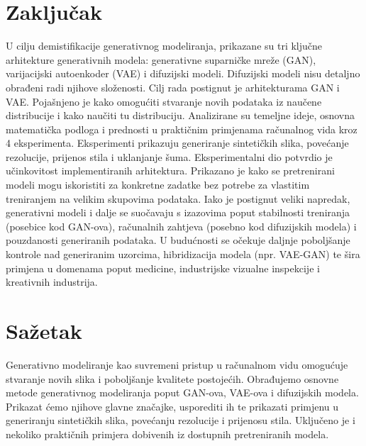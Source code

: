 \documentclass[times, utf8, seminar, numeric]{fer}
\begin{document}
		
	\chapter{Zaključak}
	U cilju demistifikacije generativnog modeliranja, prikazane su tri ključne arhitekture generativnih modela: generativne suparničke mreže (GAN), varijacijski autoenkoder (VAE) i difuzijski modeli. Difuzijski modeli nisu detaljno obrađeni radi njihove složenosti. Cilj rada postignut je arhitekturama GAN i VAE. Pojašnjeno je kako omogućiti stvaranje novih podataka iz naučene distribucije i kako naučiti tu distribuciju. Analizirane su temeljne ideje, osnovna matematička podloga i prednosti u praktičnim primjenama računalnog vida kroz 4 eksperimenta. Eksperimenti prikazuju generiranje sintetičkih slika, povećanje rezolucije, prijenos stila i uklanjanje šuma. Eksperimentalni dio potvrdio je učinkovitost implementiranih arhitektura. Prikazano je kako se pretrenirani modeli mogu iskoristiti za konkretne zadatke bez potrebe za vlastitim treniranjem na velikim skupovima podataka. Iako je postignut veliki napredak, generativni modeli i dalje se suočavaju s izazovima poput stabilnosti treniranja (posebice kod GAN-ova), računalnih zahtjeva (posebno kod difuzijskih modela) i pouzdanosti generiranih podataka. U budućnosti se očekuje daljnje poboljšanje kontrole nad generiranim uzorcima, hibridizacija modela (npr. VAE-GAN) te šira primjena u domenama poput medicine, industrijske vizualne inspekcije i kreativnih industrija.
	
	\chapter{Sažetak}
		Generativno modeliranje kao suvremeni pristup u računalnom vidu omogućuje stvaranje novih slika i poboljšanje kvalitete postojećih. Obrađujemo osnovne metode generativnog modeliranja poput GAN-ova, VAE-ova i difuzijskih modela. Prikazat ćemo njihove glavne značajke, usporediti ih te prikazati primjenu u generiranju sintetičkih slika, povećanju rezolucije i prijenosu stila. Uključeno je i nekoliko praktičnih primjera dobivenih iz dostupnih pretreniranih modela.
	
	
	
	
\end{document}
